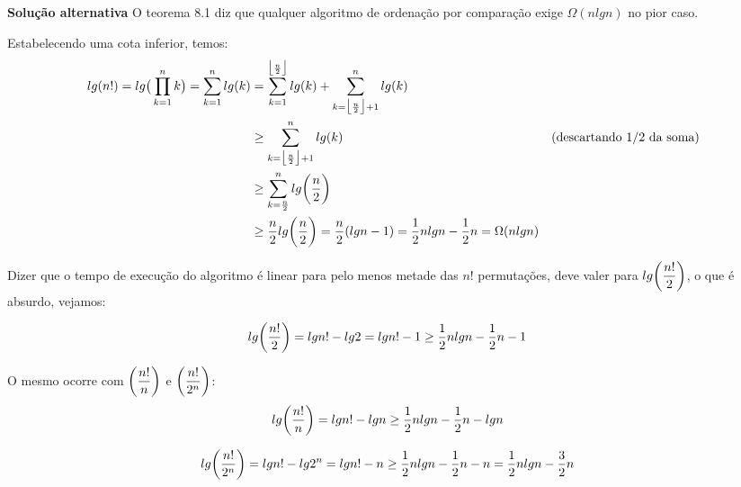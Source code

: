 
\noindent \textbf{Solução alternativa}
O teorema 8.1 diz que qualquer algoritmo de ordenação por comparação exige $\Omega(n lg n)$ no pior caso.

Estabelecendo uma cota inferior, temos:
\begin{align*}
lg(n!) = lg\big(\prod_{k=1}^n k\big) = \sum_{k=1}^n lg(k) &= \sum_{k=1}^{\big\lfloor\frac{n}{2}\big\rfloor} lg(k) + \sum_{k=\big\lfloor\frac{n}{2}\big\rfloor + 1}^n lg(k) \\
&\geq \sum_{k=\big\lfloor\frac{n}{2}\big\rfloor + 1}^n lg(k) & \text{(descartando 1/2 da soma)} \\
&\geq \sum_{k=\frac{n}{2}}^n lg\bigg(\dfrac{n}{2}\bigg) \\
&\geq \frac{n}{2} lg\bigg(\dfrac{n}{2}\bigg) = \frac{n}{2} (lgn - 1) = \frac{1}{2}nlgn - \frac{1}{2}n = \Omega(n lg n)
\end{align*}

Dizer que o tempo de execução do algoritmo é linear para pelo menos metade das $n!$ permutações, deve valer para $lg\bigg(\dfrac{n!}{2}\bigg)$, o que é absurdo, vejamos:

\begin{align*}
lg\bigg(\dfrac{n!}{2}\bigg) &= lgn! - lg2 = lgn! - 1 \geq \frac{1}{2}nlgn - \frac{1}{2}n - 1
\end{align*}

O mesmo ocorre com $\bigg(\dfrac{n!}{n}\bigg)$ e $\bigg(\dfrac{n!}{2^n}\bigg)$:
\begin{align*}
lg\bigg(\dfrac{n!}{n}\bigg) &= lgn! - lgn \geq \frac{1}{2}nlgn - \frac{1}{2}n - lgn
\end{align*}

\begin{align*}
lg\bigg(\dfrac{n!}{2^n}\bigg) &= lgn! - lg2^n = lgn! - n \geq \frac{1}{2}nlgn - \frac{1}{2}n - n = \frac{1}{2}nlgn - \frac{3}{2}n
\end{align*}